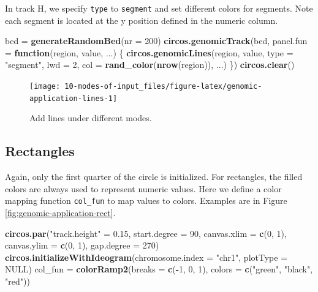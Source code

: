 \documentclass[]{book}
\newenvironment{Shaded}{\begin{snugshade}}{\end{snugshade}}
\newcommand{\KeywordTok}[1]{\textcolor[rgb]{0.13,0.29,0.53}{\textbf{#1}}}
\newcommand{\DataTypeTok}[1]{\textcolor[rgb]{0.13,0.29,0.53}{#1}}
\newcommand{\DecValTok}[1]{\textcolor[rgb]{0.00,0.00,0.81}{#1}}
\newcommand{\FloatTok}[1]{\textcolor[rgb]{0.00,0.00,0.81}{#1}}
\newcommand{\StringTok}[1]{\textcolor[rgb]{0.31,0.60,0.02}{#1}}
\newcommand{\OtherTok}[1]{\textcolor[rgb]{0.56,0.35,0.01}{#1}}
\newcommand{\ControlFlowTok}[1]{\textcolor[rgb]{0.13,0.29,0.53}{\textbf{#1}}}
\newcommand{\OperatorTok}[1]{\textcolor[rgb]{0.81,0.36,0.00}{\textbf{#1}}}
\newcommand{\NormalTok}[1]{#1}
\begin{document}
In track H, we specify \texttt{type} to \texttt{segment} and set
different colors for segments. Note each segment is located at the y
position defined in the numeric column.

\begin{Shaded}
\begin{Highlighting}[]
\NormalTok{bed =}\StringTok{ }\KeywordTok{generateRandomBed}\NormalTok{(}\DataTypeTok{nr =} \DecValTok{200}\NormalTok{)}
\KeywordTok{circos.genomicTrack}\NormalTok{(bed, }
    \DataTypeTok{panel.fun =} \ControlFlowTok{function}\NormalTok{(region, value, ...) \{}
        \KeywordTok{circos.genomicLines}\NormalTok{(region, value, }\DataTypeTok{type =} \StringTok{"segment"}\NormalTok{, }\DataTypeTok{lwd =} \DecValTok{2}\NormalTok{, }
            \DataTypeTok{col =} \KeywordTok{rand_color}\NormalTok{(}\KeywordTok{nrow}\NormalTok{(region)), ...)}
\NormalTok{\})}
\KeywordTok{circos.clear}\NormalTok{()}
\end{Highlighting}
\end{Shaded}

\begin{figure}

{\centering \texttt{[image: 10-modes-of-input\_files/figure-latex/genomic-application-lines-1]} 

}

\caption{Add lines under different modes.}\label{fig:genomic-application-lines}
\end{figure}

\subsection{Rectangles}\label{modes-rectangles}

Again, only the first quarter of the circle is initialized. For
rectangles, the filled colors are always used to represent numeric
values. Here we define a color mapping function \texttt{col\_fun} to map
values to colors. Examples are in Figure
\ref{fig:genomic-application-rect}.

\begin{Shaded}
\begin{Highlighting}[]
\KeywordTok{circos.par}\NormalTok{(}\StringTok{"track.height"}\NormalTok{ =}\StringTok{ }\FloatTok{0.15}\NormalTok{, }\DataTypeTok{start.degree =} \DecValTok{90}\NormalTok{,}
    \DataTypeTok{canvas.xlim =} \KeywordTok{c}\NormalTok{(}\DecValTok{0}\NormalTok{, }\DecValTok{1}\NormalTok{), }\DataTypeTok{canvas.ylim =} \KeywordTok{c}\NormalTok{(}\DecValTok{0}\NormalTok{, }\DecValTok{1}\NormalTok{), }\DataTypeTok{gap.degree =} \DecValTok{270}\NormalTok{)}
\KeywordTok{circos.initializeWithIdeogram}\NormalTok{(}\DataTypeTok{chromosome.index =} \StringTok{"chr1"}\NormalTok{, }\DataTypeTok{plotType =} \OtherTok{NULL}\NormalTok{)}
\NormalTok{col_fun =}\StringTok{ }\KeywordTok{colorRamp2}\NormalTok{(}\DataTypeTok{breaks =} \KeywordTok{c}\NormalTok{(}\OperatorTok{-}\DecValTok{1}\NormalTok{, }\DecValTok{0}\NormalTok{, }\DecValTok{1}\NormalTok{), }\DataTypeTok{colors =} \KeywordTok{c}\NormalTok{(}\StringTok{"green"}\NormalTok{, }\StringTok{"black"}\NormalTok{, }\StringTok{"red"}\NormalTok{))}
\end{Highlighting}
\end{Shaded}
\end{document}
